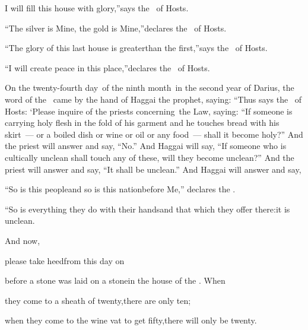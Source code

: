 \begin{inparaenum}
  \pd{}I will fill this house with glory,''\pa{}says the \lord\ of Hosts.%

  \pc{} ``The silver is Mine, the gold is Mine,''\pa{}declares the \lord\ of Hosts.%

  \pc{} ``The glory of this last%
  house is greater\pa{}than the first,''\pa{}says the \lord\ of Hosts.%

  \pd{}``I will create peace in this place,''\pa{}declares the \lord\ of Hosts.%

   On the twenty-fourth day\understood{}\ of the ninth month\understood{}\ in the second year of Darius, the word of the \lord\ came by the hand of Haggai the prophet, saying:%
   ``Thus says the \lord\ of Hosts: `Please inquire of the priests concerning\understood{}\ the Law, saying:%
   ``If someone is carrying holy flesh in the fold of his garment and he touches bread with his skirt~--- or a boiled dish or wine or oil or any food~--- shall it become holy?'' And the priest will answer and say, ``No.''%
   And Haggai will say, ``If someone who is cultically unclean shall touch any of these, will they become unclean?'' And the priest will answer and say, ``It shall be unclean.''%
   And Haggai will answer and say,\smallskip%

  \pd{}``So is this people\pa{}and so is this nation\pa{}before Me,'' declares the \lord.%

  \pd{}``So is everything they do with their hands\pa{}and that which they offer there:\pa{}it is unclean.%

  \pa{} And now,%

  \pa{}please take heed\pa{}from this day on%

  \pa{}before a stone was laid on a stone\pa{}in the house of the \lord.  When%

  \pa{}they come to a sheath of twenty,\pa{}there are only ten;%

  \pa{}when they come to the wine vat to get fifty,\pa{}there will only be twenty.%


\end{inparaenum}
